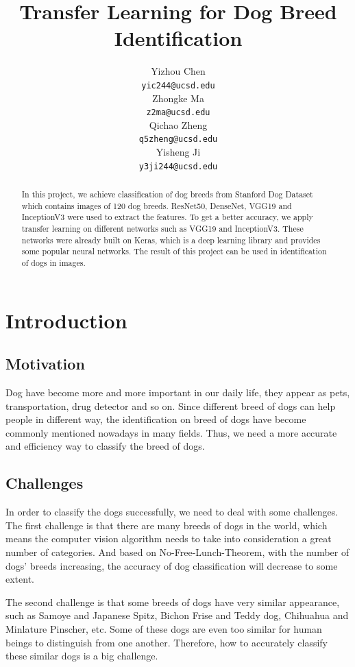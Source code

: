 \documentclass{article}
\title{Transfer Learning for Dog Breed Identification}
\author{%
  Yizhou Chen\\
  \texttt{yic244@ucsd.edu} \\
  \And
  Zhongke Ma\\
  \texttt{z2ma@ucsd.edu} \\
  \And
  Qichao Zheng\\
  \texttt{q5zheng@ucsd.edu} \\
  \And
  Yisheng Ji\\
  \texttt{y3ji244@ucsd.edu} \\
}
\begin{document}

\maketitle

\begin{abstract}
  In this project, we achieve classification of dog breeds from Stanford Dog Dataset which contains images of 120 dog breeds. ResNet50, DenseNet, VGG19 and InceptionV3 were used to extract the features. To get a better accuracy, we apply transfer learning on different networks such as VGG19 and InceptionV3. These networks were already built on Keras, which is a deep learning library and provides some popular neural networks. The result of this project can be used in identification of dogs in images.
\end{abstract}

\section{Introduction}

\subsection{Motivation}

Dog have become more and more important in our daily life, they appear as pets, transportation, drug detector and so on. Since different breed of dogs can help people in different way, the identification on breed of dogs have become commonly mentioned nowadays in many fields. Thus, we need a more accurate and efficiency way to classify the breed of dogs.

\subsection{Challenges}

In order to classify the dogs successfully, we need to deal with some challenges. 
The first challenge is that there are many breeds of dogs in the world, which means the computer vision algorithm needs to take into consideration a great number of categories. And based on No-Free-Lunch-Theorem, with the number of dogs' breeds increasing, the accuracy of dog classification will decrease to some extent.


The second challenge is that some breeds of dogs have very similar appearance, such as Samoye and Japanese Spitz, Bichon Frise and Teddy dog, Chihuahua and Minlature Pinscher, etc. Some of these dogs are even too similar for human beings to distinguish from one another. Therefore, how to accurately classify these similar dogs is a big challenge.
\end{document}

